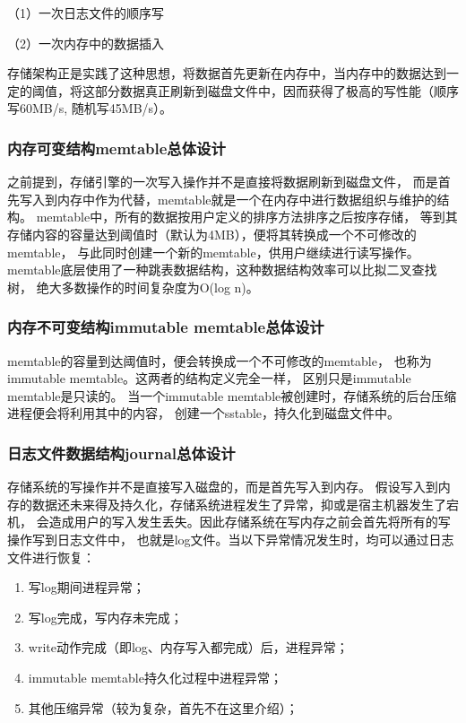 		（1）{一次日志文件的顺序写}

		（2）{一次内存中的数据插入}

		存储架构正是实践了这种思想，将数据首先更新在内存中，当内存中的数据达到一定的阈值，将这部分数据真正刷新到磁盘文件中，因而获得了极高的写性能（顺序写60MB/s, 随机写45MB/s）。

		\subsubsection{内存可变结构memtable总体设计}
		
		之前提到，存储引擎的一次写入操作并不是直接将数据刷新到磁盘文件，
		而是首先写入到内存中作为代替，memtable就是一个在内存中进行数据组织与维护的结构。
		memtable中，所有的数据按用户定义的排序方法排序之后按序存储，
		等到其存储内容的容量达到阈值时（默认为4MB），便将其转换成一个不可修改的memtable，
		与此同时创建一个新的memtable，供用户继续进行读写操作。
		memtable底层使用了一种跳表数据结构，这种数据结构效率可以比拟二叉查找树，
		绝大多数操作的时间复杂度为O(log n)。

		\subsubsection{内存不可变结构immutable memtable总体设计}

		memtable的容量到达阈值时，便会转换成一个不可修改的memtable，
		也称为immutable memtable。这两者的结构定义完全一样，
		区别只是immutable memtable是只读的。
		当一个immutable memtable被创建时，存储系统的后台压缩进程便会将利用其中的内容，
		创建一个sstable，持久化到磁盘文件中。

		\subsubsection{日志文件数据结构journal总体设计}

		存储系统的写操作并不是直接写入磁盘的，而是首先写入到内存。
		假设写入到内存的数据还未来得及持久化，存储系统进程发生了异常，抑或是宿主机器发生了宕机，
		会造成用户的写入发生丢失。因此存储系统在写内存之前会首先将所有的写操作写到日志文件中，
		也就是log文件。当以下异常情况发生时，均可以通过日志文件进行恢复：

		\begin{enumerate}
			\item 写log期间进程异常；
			\item 写log完成，写内存未完成；
			\item write动作完成（即log、内存写入都完成）后，进程异常；
			\item immutable memtable持久化过程中进程异常；
			\item 其他压缩异常（较为复杂，首先不在这里介绍）；
		\end{enumerate}
	
